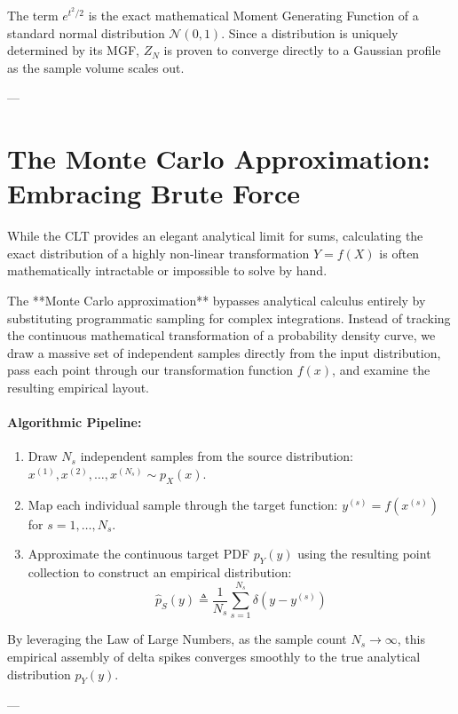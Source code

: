 \documentclass{article}
\begin{document}
The term $e^{t^2/2}$ is the exact mathematical Moment Generating Function of a standard normal distribution $\mathcal{N}(0,1)$. Since a distribution is uniquely determined by its MGF, $Z_N$ is proven to converge directly to a Gaussian profile as the sample volume scales out.

---

\section*{The Monte Carlo Approximation: Embracing Brute Force}

While the CLT provides an elegant analytical limit for sums, calculating the exact distribution of a highly non-linear transformation $Y = f(X)$ is often mathematically intractable or impossible to solve by hand.

The **Monte Carlo approximation** bypasses analytical calculus entirely by substituting programmatic sampling for complex integrations. Instead of tracking the continuous mathematical transformation of a probability density curve, we draw a massive set of independent samples directly from the input distribution, pass each point through our transformation function $f(x)$, and examine the resulting empirical layout.

\paragraph{Algorithmic Pipeline:}
\begin{enumerate}
    \item Draw $N_s$ independent samples from the source distribution: $x^{(1)}, x^{(2)}, \dots, x^{(N_s)} \sim p_X(x)$.
    \item Map each individual sample through the target function: $y^{(s)} = f(x^{(s)})$ for $s = 1, \dots, N_s$.
    \item Approximate the continuous target PDF $p_Y(y)$ using the resulting point collection to construct an empirical distribution:
    \begin{equation}
    \hat{p}_S(y) \triangleq \frac{1}{N_s} \sum_{s=1}^{N_s} \delta(y - y^{(s)}) \tag{238}
    \end{equation}
\end{enumerate}
By leveraging the Law of Large Numbers, as the sample count $N_s \to \infty$, this empirical assembly of delta spikes converges smoothly to the true analytical distribution $p_Y(y)$.

---
\end{document}

